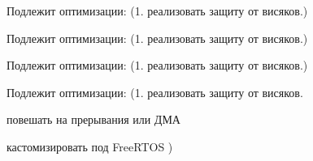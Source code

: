 
\begin{DoxyRefList}
\item[Глобальный \mbox{\hyperlink{_i2_c_8c_aea7ccb1f68c35c1ace876675a6c406d7}{\+\_\+\+\_\+attribute\+\_\+\+\_\+}} ((always\+\_\+inline))]\label{todo__todo000001}%
%
Подлежит оптимизации\+: (1. реализовать защиту от висяков.) 

\label{todo__todo000002}%
%
Подлежит оптимизации\+: (1. реализовать защиту от висяков.) 

\label{todo__todo000003}%
%
Подлежит оптимизации\+: (1. реализовать защиту от висяков.)  
\item[Глобальный \mbox{\hyperlink{_i2_c_8h_afe7122240bd4778fd24ebd669578cdcd}{e\+I2\+C\+\_\+\+Endianness}} ]\label{todo__todo000004}%
%
Подлежит оптимизации\+: (1. реализовать защиту от висяков.
\begin{DoxyEnumerate}
\item повешать на прерывания или ДМА
\item кастомизировать под Free\+R\+T\+OS ) 
\end{DoxyEnumerate}
\end{DoxyRefList}